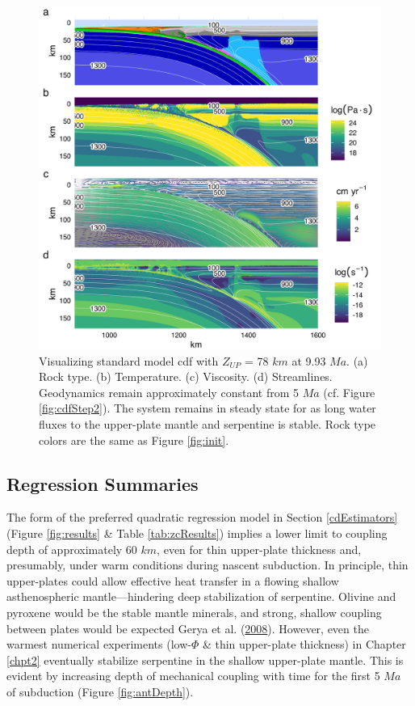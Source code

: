 \begin{figure}[htbp]

{\centering \includegraphics[width=1\linewidth,]{assets/figs/chpt2/figA4} 

}

\caption[Results for model cdf with $Z_{UP}$ = 78 $km$ at 9.93 $Ma$]{Visualizing standard model cdf with $Z_{UP}$ = 78 $km$ at 9.93 $Ma$. (a) Rock type. (b) Temperature. (c) Viscosity. (d) Streamlines. Geodynamics remain approximately constant from 5 $Ma$ (cf. Figure \ref{fig:cdfStep2}). The system remains in steady state for as long water fluxes to the upper-plate mantle and serpentine is stable. Rock type colors are the same as Figure \ref{fig:init}.}\label{fig:cdfStep3}
\end{figure}

\clearpage

\hypertarget{regSummary}{%
\subsection{Regression Summaries}\label{regSummary}}

The form of the preferred quadratic regression model in Section \ref{cdEstimators} (Figure \ref{fig:results} \& Table \ref{tab:zcResults}) implies a lower limit to coupling depth of approximately 60 \(km\), even for thin upper-plate thickness and, presumably, under warm conditions during nascent subduction. In principle, thin upper-plates could allow effective heat transfer in a flowing shallow asthenospheric mantle---hindering deep stabilization of serpentine. Olivine and pyroxene would be the stable mantle minerals, and strong, shallow coupling between plates would be expected Gerya et al. (\protect\hyperlink{ref-gerya2008}{2008}). However, even the warmest numerical experiments (low-\(\Phi\) \& thin upper-plate thickness) in Chapter \ref{chpt2} eventually stabilize serpentine in the shallow upper-plate mantle. This is evident by increasing depth of mechanical coupling with time for the first 5 \(Ma\) of subduction (Figure \ref{fig:antDepth}).

